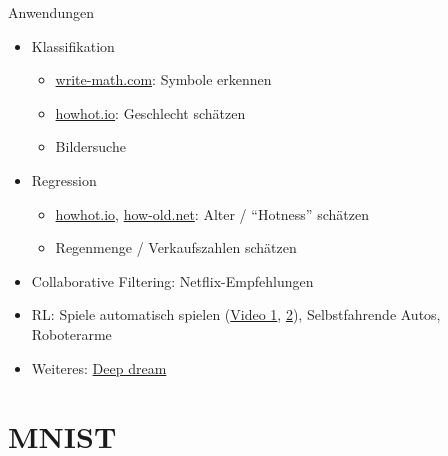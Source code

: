 \documentclass{beamer}
\begin{document}
\begin{frame}{Anwendungen}
    \begin{itemize}
        \item Klassifikation
        \begin{itemize}
            \item \href{http://write-math.com}{write-math.com}: Symbole erkennen
            \item \href{https://howhot.io/}{howhot.io}: Geschlecht schätzen
            \item Bildersuche
        \end{itemize}
        \item Regression
        \begin{itemize}
            \item \href{https://howhot.io/}{howhot.io}, \href{http://how-old.net/}{how-old.net}: Alter / \enquote{Hotness} schätzen
            \item Regenmenge / Verkaufszahlen schätzen
        \end{itemize}
        \item Collaborative Filtering: Netflix-Empfehlungen
        \item RL: Spiele automatisch spielen (\href{https://www.youtube.com/watch?v=V1eYniJ0Rnk}{Video 1}, \href{https://www.youtube.com/watch?v=Ci8uvfVg_24&list=PLgOp827qARy0qNyZq5Y6S6vRJO3tb1WcW}{2}), Selbstfahrende Autos, Roboterarme
        \item Weiteres: \href{http://deepdreamgenerator.com/}{Deep dream}
    \end{itemize}
\end{frame}

\section{MNIST}
\end{document}
